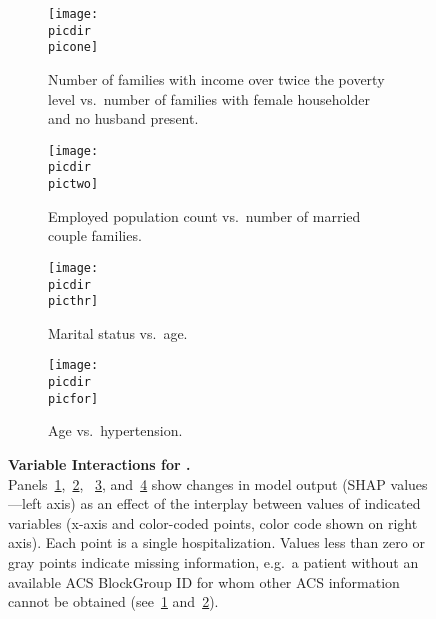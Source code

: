 \begin{figure}
\begin{adjustbox}{minipage=7.0in,frame}
\vspace{2.5mm}
\centering
%
\def\target{race}
%
\def\picdir{supplementary/\target/}
%
\def\labbig{fig:raceint}
%
\def\picone{\target_SHAP_dependence_8.pdf}
\def\pictwo{\target_SHAP_dependence_5.pdf}
\def\picthr{\target_SHAP_dependence_3.pdf}
\def\picfor{\target_SHAP_dependence_2.pdf}
\def\capone{Number of families with income over twice the poverty level vs.\ number of families with female householder and no husband present.}
\def\labone{fig:raceintincfemhh}
\def\captwo{Employed population count vs.\ number of married couple families.}
\def\labtwo{fig:raceintempmarried}
\def\capthr{Marital status vs.\ age.}
\def\labthr{fig:raceintmarriedage}
\def\capfor{Age vs.\ hypertension.}
\def\labfor{fig:raceintagehtn}
%
\def\capbig{\textbf{Variable Interactions for \titlecap{\target}.} \\ %
Panels~\ref{\labone},~\ref{\labtwo}, %
~\ref{\labthr}, and~\ref{\labfor} %
show changes in model output (SHAP values---left axis) %
as an effect of the interplay between %
values of indicated variables (x-axis and color-coded points, %
color code shown on right axis).\@
Each point is a single hospitalization.\@
Values less than zero or gray points indicate missing information, e.g.\ 
a patient without an available ACS BlockGroup ID 
for whom other ACS information cannot be obtained (see~\ref{\labone} and~\ref{\labtwo}).\@
}
%
%
\begin{subfigure}[t]{.45\linewidth}
    \centering
    \captionsetup[subfigure]{}
    \caption{\capone{}}\label{\labone}
    \texttt{[image: \\picdir\\picone]}
\end{subfigure}%
\hspace{5mm}%
\begin{subfigure}[t]{.45\linewidth}
    \centering
    \captionsetup[subfigure]{}
    \caption{\captwo}\label{\labtwo}
    \texttt{[image: \\picdir\\pictwo]}
\end{subfigure}%

\vspace{5mm}
\begin{subfigure}[t]{.45\linewidth}
    \centering
    \captionsetup[subfigure]{}
    \caption{\capthr}\label{\labthr}
    \texttt{[image: \\picdir\\picthr]}
\end{subfigure}%
\hspace{5mm}%
\begin{subfigure}[t]{.45\linewidth}
    \centering
    \captionsetup[subfigure]{}
    \caption{\capfor}\label{\labfor}
    \texttt{[image: \\picdir\\picfor]}
\end{subfigure}%

\caption{\capbig}\label{\labbig}
\end{adjustbox}
\end{figure}